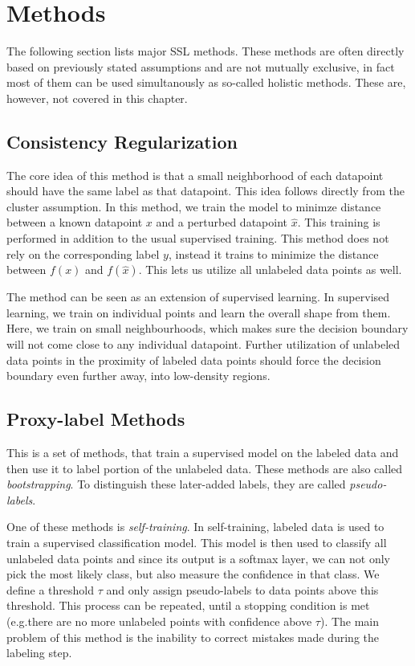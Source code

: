 \section{Methods}
\label{sec:SslMethods}

The following section lists major SSL methods. These methods are often directly based on previously stated assumptions and are not mutually exclusive, in fact most of them can be used simultanously as so-called holistic methods. These are, however, not covered in this chapter.


\subsection{Consistency Regularization}

The core idea of this method is that a small neighborhood of each datapoint should have the same label as that datapoint. This idea follows directly from the cluster assumption. In this method, we train the model to minimze distance between a known datapoint $x$ and a perturbed datapoint $\hat{x}$. This training is performed in addition to the usual supervised training. This method does not rely on the corresponding label $y$, instead it trains to minimize the distance between $f(x)$ and $f(\hat{x})$. This lets us utilize all unlabeled data points as well.

The method can be seen as an extension of supervised learning. In supervised learning, we train on individual points and learn the overall shape from them. Here, we train on small neighbourhoods, which makes sure the decision boundary will not come close to any individual datapoint. Further utilization of unlabeled data points in the proximity of labeled data points should force the decision boundary even further away, into low-density regions.


\subsection{Proxy-label Methods}

This is a set of methods, that train a supervised model on the labeled data and then use it to label portion of the unlabeled data. These methods are also called \emph{bootstrapping}. To distinguish these later-added labels, they are called \emph{pseudo-labels}.

One of these methods is \emph{self-training}. In self-training, labeled data is used to train a supervised classification model. This model is then used to classify all unlabeled data points and since its output is a softmax layer, we can not only pick the most likely class, but also measure the confidence in that class. We define a threshold $\tau$ and only assign pseudo-labels to data points above this threshold. This process can be repeated, until a stopping condition is met (e.g.\@ there are no more unlabeled points with confidence above $\tau$). The main problem of this method is the inability to correct mistakes made during the labeling step.

